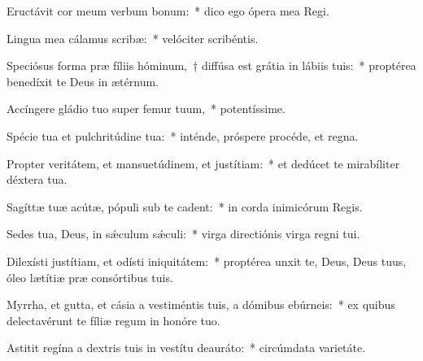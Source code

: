 \item Eructávit cor meum verbum bonum:~* dico ego ópera mea Regi.

\item Lingua mea cálamus scribæ:~* velóciter scribéntis.

\item Speciósus forma præ fíliis hóminum,~† diffúsa est grátia in lábiis tuis:~* proptérea benedíxit te Deus in ætérnum.

\item Accíngere gládio tuo super femur tuum,~* potentíssime.

\item Spécie tua et pulchritúdine tua:~* inténde, próspere procéde, et regna.

\item Propter veritátem, et mansuetúdinem, et justítiam:~* et dedúcet te mirabíliter déxtera tua.

\item Sagíttæ tuæ acútæ, pópuli sub te cadent:~* in corda inimicórum Regis.

\item Sedes tua, Deus, in sǽculum sǽculi:~* virga directiónis virga regni tui.

\item Dilexísti justítiam, et odísti iniquitátem:~* proptérea unxit te, Deus, Deus tuus, óleo lætítiæ præ consórtibus tuis.

\item Myrrha, et gutta, et cásia a vestiméntis tuis, a dómibus ebúrneis:~* ex quibus delectavérunt te fíliæ regum in honóre tuo.

\item Astitit regína a dextris tuis in vestítu deauráto:~* circúmdata varietáte.


